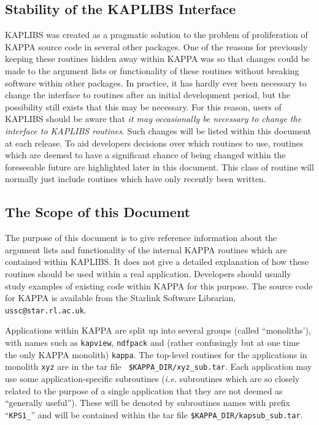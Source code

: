 \subsection{Stability of the KAPLIBS Interface}
KAPLIBS was created as a pragmatic solution to the problem of
proliferation of KAPPA source code in several other packages. One of the
reasons for previously keeping these routines hidden away within KAPPA was
so that changes could be made to the argument lists or functionality
of these routines without breaking software within other packages. In
practice, it has hardly ever been necessary to change the interface to
routines after an initial development period, but the possibility still
exists that this may be necessary. For this reason, users of KAPLIBS
should be aware that \emph{it may occasionally be necessary to change the
interface to KAPLIBS routines}. Such changes will be listed within
this document at each release. To aid developers decisions over which
routines to use, routines which are deemed to have a significant chance
of being changed within the foreseeable future are highlighted later in
this document. This class of routine will normally just include routines
which have only recently been written.

\subsection{The Scope of this Document}
The purpose of this document is to give reference information about the
argument lists and functionality of the internal KAPPA routines which are
contained within KAPLIBS. It does not give a detailed explanation of how
these routines should be used within a real application. Developers
should usually study examples of existing code within KAPPA for this
purpose. The source code for KAPPA is available from the Starlink
Software Librarian, {\tt ussc@star.rl.ac.uk}.

Applications within KAPPA are split up into several groups (called
``monoliths'), with names such as {\tt kapview}, {\tt ndfpack} and
(rather confusingly but at one time the only KAPPA monolith)
{\tt kappa}. The top-level routines for the
applications in monolith {\tt xyz} are in the tar file {\tt
\$KAPPA\_DIR/xyz\_sub.tar}. Each application may use some
application-specific subroutines (\emph{i.e.} subroutines which are so
closely related to the purpose of a single application that they are not
deemed as ``generally useful''). These will be denoted by subroutines
names with prefix ``{\tt KPS1\_}'' and will be contained within the tar
file {\tt \$KAPPA\_DIR/kapsub\_sub.tar}.


